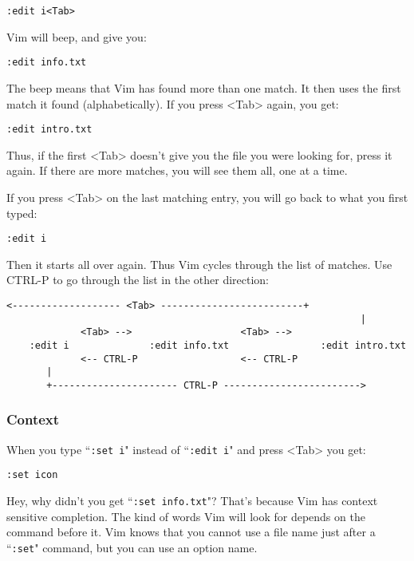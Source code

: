 \begin{Verbatim}[samepage=true]
 :edit i<Tab>
\end{Verbatim}

Vim will beep, and give you:

\begin{Verbatim}[samepage=true]
 :edit info.txt
\end{Verbatim}

The beep means that Vim has found more than one match.
It then uses the first match it found (alphabetically).
If you press <Tab> again, you get:

\begin{Verbatim}[samepage=true]
 :edit intro.txt
\end{Verbatim}

Thus, if the first <Tab> doesn't give you the file you were looking for, press it again.
If there are more matches, you will see them all, one at a time.

If you press <Tab> on the last matching entry, you will go back to what you first typed:

\begin{Verbatim}[samepage=true]
 :edit i
\end{Verbatim}

Then it starts all over again.
Thus Vim cycles through the list of matches.
Use CTRL-P to go through the list in the other direction:

\begin{Verbatim}[samepage=true]
          <------------------- <Tab> -------------------------+
                                                              |
             <Tab> -->                   <Tab> -->
    :edit i              :edit info.txt                :edit intro.txt
             <-- CTRL-P                  <-- CTRL-P
       |
       +---------------------- CTRL-P ------------------------>
\end{Verbatim}
\subsubsection{Context}
When you type ``\texttt{:set i}" instead of ``\texttt{:edit i}" and press <Tab> you get:

\begin{Verbatim}[samepage=true]
 :set icon
\end{Verbatim}

Hey, why didn't you get ``\texttt{:set info.txt}"?
That's because Vim has context sensitive completion.
The kind of words Vim will look for depends on the command before it.
Vim knows that you cannot use a file name just after a ``\texttt{:set}" command, but you can use an option name.

